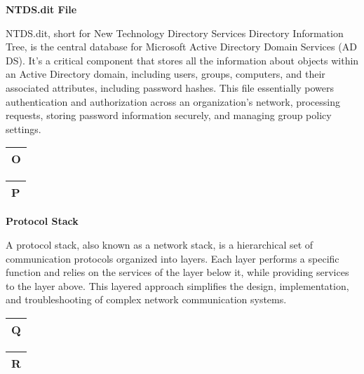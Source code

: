 \textbf{NTDS.dit File}

NTDS.dit, short for New Technology Directory Services Directory Information Tree, is the central database for Microsoft Active Directory Domain Services (AD DS). It's a critical component that stores all the information about objects within an Active Directory domain, including users, groups, computers, and their associated attributes, including password hashes. This file essentially powers authentication and authorization across an organization's network, processing requests, storing password information securely, and managing group policy settings.

\begin{table}
\justifying

\begin{tabular}{l}
\textbf{O} \\
\hline

\end{tabular}

\end{table}

\begin{table}
\justifying

\begin{tabular}{l}
\textbf{P} \\
\hline

\end{tabular}

\end{table}

\textbf{Protocol Stack}

A protocol stack, also known as a network stack, is a hierarchical set of communication protocols organized into layers. Each layer performs a specific function and relies on the services of the layer below it, while providing services to the layer above. This layered approach simplifies the design, implementation, and troubleshooting of complex network communication systems.

\begin{table}
\justifying

\begin{tabular}{l}
\textbf{Q} \\
\hline

\end{tabular}

\end{table}

\begin{table}
\justifying

\begin{tabular}{l}
\textbf{R} \\
\hline

\end{tabular}

\end{table}


